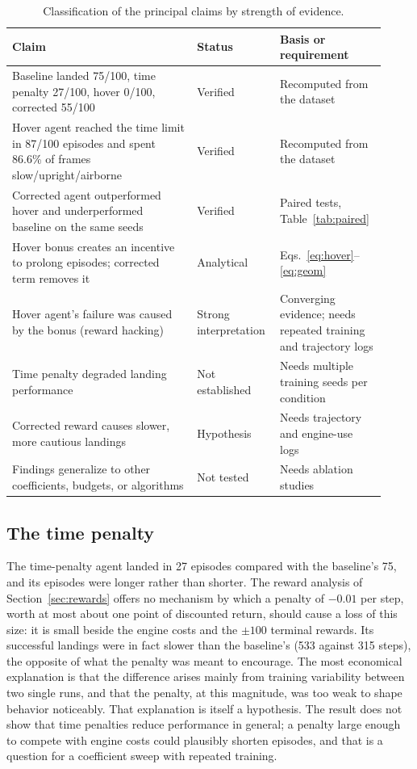 \documentclass[11pt,a4paper]{article}
\begin{document}
\begin{table}[!htb]
\caption[Classification of claims by strength of evidence]{Classification of the principal claims by strength of evidence.}\label{tab:evidence}
\centering\footnotesize
\begin{tabular}{@{}p{0.47\linewidth}p{0.18\linewidth}p{0.27\linewidth}@{}}
\toprule
Claim & Status & Basis or requirement \\
\midrule
Baseline landed 75/100, time penalty 27/100, hover 0/100, corrected 55/100 & Verified & Recomputed from the dataset \\
Hover agent reached the time limit in 87/100 episodes and spent 86.6\% of frames slow/upright/airborne & Verified & Recomputed from the dataset \\
Corrected agent outperformed hover and underperformed baseline on the same seeds & Verified & Paired tests, Table~\ref{tab:paired} \\
Hover bonus creates an incentive to prolong episodes; corrected term removes it & Analytical & Eqs.~\eqref{eq:hover}--\eqref{eq:geom} \\
Hover agent's failure was caused by the bonus (reward hacking) & Strong interpretation & Converging evidence; needs repeated training and trajectory logs \\
Time penalty degraded landing performance & Not established & Needs multiple training seeds per condition \\
Corrected reward causes slower, more cautious landings & Hypothesis & Needs trajectory and engine-use logs \\
Findings generalize to other coefficients, budgets, or algorithms & Not tested & Needs ablation studies \\
\bottomrule
\end{tabular}
\end{table}

\subsection{The time penalty}

The time-penalty agent landed in 27 episodes compared with the baseline's 75, and its episodes were longer rather than shorter. The reward analysis of Section~\ref{sec:rewards} offers no mechanism by which a penalty of $-0.01$ per step, worth at most about one point of discounted return, should cause a loss of this size: it is small beside the engine costs and the $\pm100$ terminal rewards. Its successful landings were in fact slower than the baseline's (533 against 315 steps), the opposite of what the penalty was meant to encourage. The most economical explanation is that the difference arises mainly from training variability between two single runs, and that the penalty, at this magnitude, was too weak to shape behavior noticeably. That explanation is itself a hypothesis. The result does not show that time penalties reduce performance in general; a penalty large enough to compete with engine costs could plausibly shorten episodes, and that is a question for a coefficient sweep with repeated training.
\end{document}

